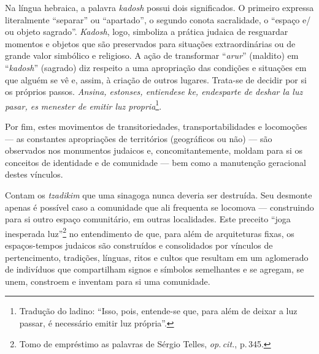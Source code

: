 Na língua hebraica, a palavra \emph{kadosh} possui dois significados. O
primeiro expressa literalmente ``separar'' ou ``apartado'', o segundo
conota sacralidade, o ``espaço e/\,ou objeto sagrado''. \emph{Kadosh},
logo, simboliza a prática judaica de resguardar momentos e objetos que
são preservados para situações extraordinárias ou de grande valor
simbólico e religioso. A ação de transformar ``\emph{arur}'' (maldito)
em ``\emph{kadosh}'' (sagrado) diz respeito a uma apropriação das
condições e situações em que alguém se vê e, assim, à criação de outros
lugares. Trata-se de decidir por si os próprios passos. \emph{Ansina,
estonses, entiendese ke, endesparte de deshar la luz pasar, es menester
de emitir luz propria}\footnote{Tradução do ladino: ``Isso, pois,
  entende-se que, para além de deixar a luz passar, é necessário emitir
  luz própria''.}.

Por fim, estes movimentos de transitoriedades, transportabilidades e
locomoções --- as constantes apropriações de territórios (geográficos ou
não) --- são observados nos monumentos judaicos e, concomitantemente,
moldam para si os conceitos de identidade e de comunidade --- bem como a
manutenção geracional destes vínculos.

\begin{center}\end{center}

\noindent{}Contam os \emph{tzadikim} que uma sinagoga nunca deveria ser destruída.
Seu desmonte apenas é possível caso a comunidade que ali frequenta se
locomova --- construindo para si outro espaço comunitário, em outras
localidades. Este preceito ``joga inesperada luz''\footnote{Tomo de
  empréstimo as palavras de Sérgio Telles, \emph{op.\,cit.}, p.\,345.} no
entendimento de que, para além de arquiteturas fixas, os espaços-tempos
judaicos são construídos e consolidados por vínculos de pertencimento,
tradições, línguas, ritos e cultos que resultam em um aglomerado de
indivíduos que compartilham signos e símbolos semelhantes e se agregam,
se unem, constroem e inventam para si uma comunidade.

